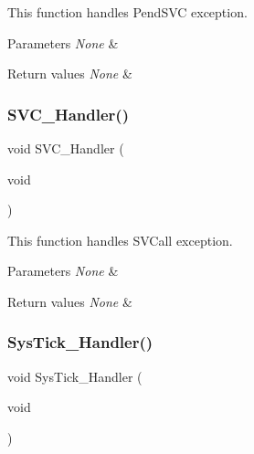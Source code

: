This function handles Pend\+S\+VC exception. 


\begin{DoxyParams}{Parameters}
{\em None} & \\
\hline
\end{DoxyParams}

\begin{DoxyRetVals}{Return values}
{\em None} & \\
\hline
\end{DoxyRetVals}
\mbox{\label{group__UART__TwoBoards__ComIT_ga5e9cc540fdf30d55c5648d8e9f8f6013}} 
\subsubsection{\texorpdfstring{S\+V\+C\+\_\+\+Handler()}{SVC\_Handler()}}
{\footnotesize\ttfamily void S\+V\+C\+\_\+\+Handler (\begin{DoxyParamCaption}\item[{void}]{ }\end{DoxyParamCaption})}



This function handles S\+V\+Call exception. 


\begin{DoxyParams}{Parameters}
{\em None} & \\
\hline
\end{DoxyParams}

\begin{DoxyRetVals}{Return values}
{\em None} & \\
\hline
\end{DoxyRetVals}
\mbox{\label{group__UART__TwoBoards__ComIT_ga5380dd1db43723a5b8c5e57913886044}} 
\subsubsection{\texorpdfstring{Sys\+Tick\+\_\+\+Handler()}{SysTick\_Handler()}}
{\footnotesize\ttfamily void Sys\+Tick\+\_\+\+Handler (\begin{DoxyParamCaption}\item[{void}]{ }\end{DoxyParamCaption})}




